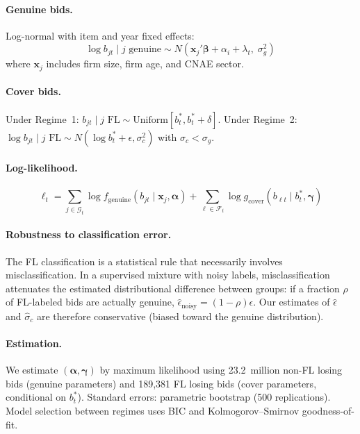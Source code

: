 \paragraph{Genuine bids.} Log-normal with item and year fixed effects:
\begin{equation}
  \log b_{jt} \mid j \text{ genuine} \sim
  N\!\left(\mathbf{x}_j'\boldsymbol{\beta} + \alpha_i + \lambda_t,
  \; \sigma_g^2\right)
  \label{eq:genuine_dist}
\end{equation}
where $\mathbf{x}_j$ includes firm size, firm age, and CNAE sector.

\paragraph{Cover bids.} Under Regime~1:
$b_{jt} \mid j \text{ FL} \sim \text{Uniform}[b^*_t, b^*_t + \delta]$.
Under Regime~2:
$\log b_{jt} \mid j \text{ FL} \sim N(\log b^*_t + \epsilon, \sigma_c^2)$
with $\sigma_c < \sigma_g$.

\paragraph{Log-likelihood.}
\begin{equation}
  \ell_t = \sum_{j \in \mathcal{G}_t} \log f_{\text{genuine}}(b_{jt}
  \mid \mathbf{x}_j, \boldsymbol{\alpha})
  + \sum_{\ell \in \mathcal{F}_t} \log g_{\text{cover}}(b_{\ell t}
  \mid b^*_t, \boldsymbol{\gamma})
  \label{eq:loglik}
\end{equation}

\paragraph{Robustness to classification error.}
The FL classification is a statistical rule that necessarily involves
misclassification. In a supervised mixture with noisy labels,
misclassification attenuates the estimated distributional difference
between groups: if a fraction $\rho$ of FL-labeled bids are
actually genuine, $\hat{\epsilon}_{\text{noisy}} =
(1-\rho) \epsilon$. Our estimates of $\hat{\epsilon}$ and
$\hat{\sigma}_c$ are therefore conservative (biased toward the
genuine distribution).

\paragraph{Estimation.}
We estimate $(\boldsymbol{\alpha}, \boldsymbol{\gamma})$ by maximum
likelihood using 23.2~million non-FL losing bids (genuine
parameters) and 189,381 FL losing bids (cover parameters,
conditional on $b^*_t$). Standard errors: parametric bootstrap
(500 replications). Model selection between regimes uses BIC and
Kolmogorov--Smirnov goodness-of-fit.

